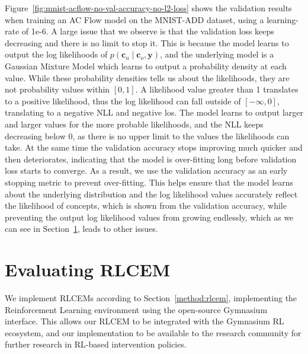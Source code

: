 Figure~\ref{fig:mnist-acflow-no-val-accuracy-no-l2-loss} shows the 
validation results when training an AC Flow model
on the MNIST-ADD dataset, using a learning-rate of 1e-6.
A large issue that we observe is that the validation loss
keeps decreasing and there is no limit to stop it.
This is because the model learns to output the log likelihoods 
of $p(\mathbf{c}_u \mid \mathbf{c}_o, \mathbf{y})$, and the underlying
model is a Gaussian Mixture Model which learns to output
a probability density at each value. While these probability densities
tells us about the likelihoods,
they are not probability values within $[0,1]$. A likelihood value greater than 1 translates to a positive likelihood,
thus the log likelihood can fall outside of $[-\infty, 0]$,
translating to a negative NLL and negative los.
The model learns to output larger and larger
values for the more probable likelihoods, and the NLL keeps decreasing
below 0, as there is no upper limit to the values the likelihoods can take.
 At the same time the validation accuracy stops improving
 much quicker and then deteriorates, indicating that the model is over-fitting
long before validation loss starts to converge.
As a result, we use the validation accuracy as an early stopping
metric to prevent over-fitting. This helps ensure that 
the model learns about the underlying distribution and 
the log likelihood values accurately reflect the likelihood 
of concepts, which is 
shown from the validation accuracy, while preventing 
the output log likelihood values from growing endlessly, which
as we can see in Section~\ref{eval:rlcem-performance}, 
leads to other issues.

\section{Evaluating RLCEM}\label{eval:rlcem-performance}

We implement RLCEMs according to Section~\ref{method:rlcem},
implementing the Reinforcement Learning environment using the 
open-source
Gymnasium~\cite{gymnasium} interface. This allows our RLCEM to be integrated
 with the Gymnasium RL ecosystem, and our implementation
to be available to the research community for further research in 
RL-based intervention policies.

